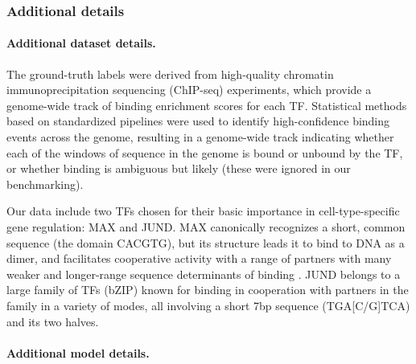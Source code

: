 \subsubsection{Additional details}
\label{sec:app_etwilds}

\paragraph{Additional dataset details.}
The ground-truth labels were derived from high-quality chromatin immunoprecipitation sequencing (ChIP-seq) experiments, which provide a genome-wide track of binding enrichment scores for each TF.
Statistical methods based on standardized pipelines \citep{EncodeChipseq12} were used to identify high-confidence binding events across the genome, resulting in a genome-wide track indicating whether each of the windows of sequence in the genome is bound or unbound by the TF, or whether binding is ambiguous but likely (these were ignored in our benchmarking).

Our data include two TFs chosen for their basic importance in cell-type-specific gene regulation: MAX and JUND.
MAX canonically recognizes a short, common sequence (the domain CACGTG), but its structure leads it to bind to DNA as a dimer, and facilitates cooperative activity with a range of partners \citep{grandori2000myc} with many weaker and longer-range sequence determinants of binding \citep{allevato2017sequence}.
JUND belongs to a large family of TFs (bZIP) known for binding in cooperation with partners in the family in a variety of modes, all involving a short 7bp sequence (TGA[C/G]TCA) and its two halves.

\paragraph{Additional model details.}

